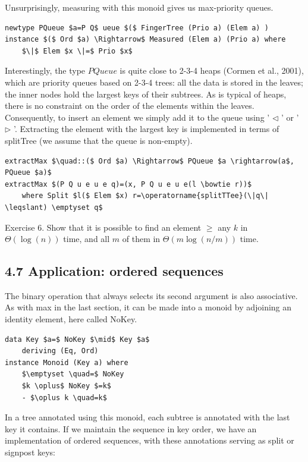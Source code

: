 \documentclass[10pt]{article}
\begin{document}
Unsurprisingly, measuring with this monoid gives us max-priority queues.

\begin{verbatim}
newtype PQueue $a=P Q$ ueue $($ FingerTree (Prio a) (Elem a) )
instance $($ Ord $a) \Rightarrow$ Measured (Elem a) (Prio a) where
    $\|$ Elem $x \|=$ Prio $x$
\end{verbatim}

Interestingly, the type $P Q u e u e$ is quite close to 2-3-4 heaps (Cormen et al., 2001), which are priority queues based on 2-3-4 trees: all the data is stored in the leaves; the inner nodes hold the largest keys of their subtrees. As is typical of heaps, there is no constraint on the order of the elements within the leaves. Consequently, to insert an element we simply add it to the queue using ' $\triangleleft$ ' or ' $\triangleright$ '. Extracting the element with the largest key is implemented in terms of splitTree (we assume that the queue is non-empty).

\begin{verbatim}
extractMax $\quad::($ Ord $a) \Rightarrow$ PQueue $a \rightarrow(a$, PQueue $a)$
extractMax $(P Q u e u e q)=(x, P Q u e u e(l \bowtie r))$
    where Split $l($ Elem $x) r=\operatorname{splitTTee}(\|q\| \leqslant) \emptyset q$
\end{verbatim}

Exercise 6. Show that it is possible to find an element $\geqslant$ any $k$ in $\Theta(\log (n))$ time, and all $m$ of them in $\Theta(m \log (n / m))$ time.

\subsection*{4.7 Application: ordered sequences}
The binary operation that always selects its second argument is also associative. As with max in the last section, it can be made into a monoid by adjoining an identity element, here called NoKey.

\begin{verbatim}
data Key $a=$ NoKey $\mid$ Key $a$
    deriving (Eq, Ord)
instance Monoid (Key a) where
    $\emptyset \quad=$ NoKey
    $k \oplus$ NoKey $=k$
    - $\oplus k \quad=k$
\end{verbatim}

In a tree annotated using this monoid, each subtree is annotated with the last key it contains. If we maintain the sequence in key order, we have an implementation of ordered sequences, with these annotations serving as split or signpost keys:
\end{document}
